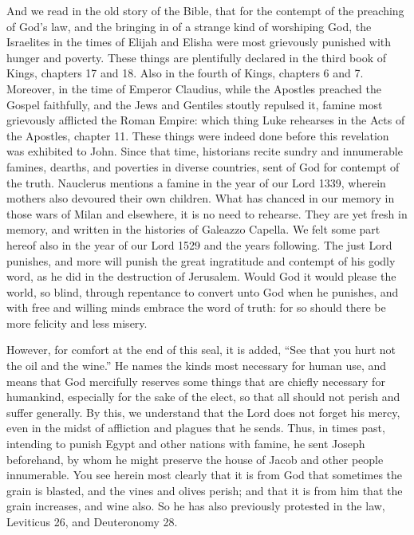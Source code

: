 And we read in the old story of the Bible, that for the contempt of the preaching of God’s law, and the bringing in of a strange kind of worshiping God, the Israelites in the times of Elijah and Elisha were most grievously punished with hunger and poverty. These things are plentifully declared in the third book of Kings, chapters 17 and 18. Also in the fourth of Kings, chapters 6 and 7. Moreover, in the time of Emperor Claudius, while the Apostles preached the Gospel faithfully, and the Jews and Gentiles stoutly repulsed it, famine most grievously afflicted the Roman Empire: which thing Luke rehearses in the Acts of the Apostles, chapter 11. These things were indeed done before this revelation was exhibited to John. Since that time, historians recite sundry and innumerable famines, dearths, and poverties in diverse countries, sent of God for contempt of the truth. Nauclerus mentions a famine in the year of our Lord 1339, wherein mothers also devoured their own children. What has chanced in our memory in those wars of Milan and elsewhere, it is no need to rehearse. They are yet fresh in memory, and written in the histories of Galeazzo Capella. We felt some part hereof also in the year of our Lord 1529 and the years following. The just Lord punishes, and more will punish the great ingratitude and contempt of his godly word, as he did in the destruction of Jerusalem. Would God it would please the world, so blind, through repentance to convert unto God when he punishes, and with free and willing minds embrace the word of truth: for so should there be more felicity and less misery.

However, for comfort at the end of this seal, it is added, “See that you hurt not the oil and the wine.” He names the kinds most necessary for human use, and means that God mercifully reserves some things that are chiefly necessary for humankind, especially for the sake of the elect, so that all should not perish and suffer generally. By this, we understand that the Lord does not forget his mercy, even in the midst of affliction and plagues that he sends. Thus, in times past, intending to punish Egypt and other nations with famine, he sent Joseph beforehand, by whom he might preserve the house of Jacob and other people innumerable. You see herein most clearly that it is from God that sometimes the grain is blasted, and the vines and olives perish; and that it is from him that the grain increases, and wine also. So he has also previously protested in the law, Leviticus 26, and Deuteronomy 28.

